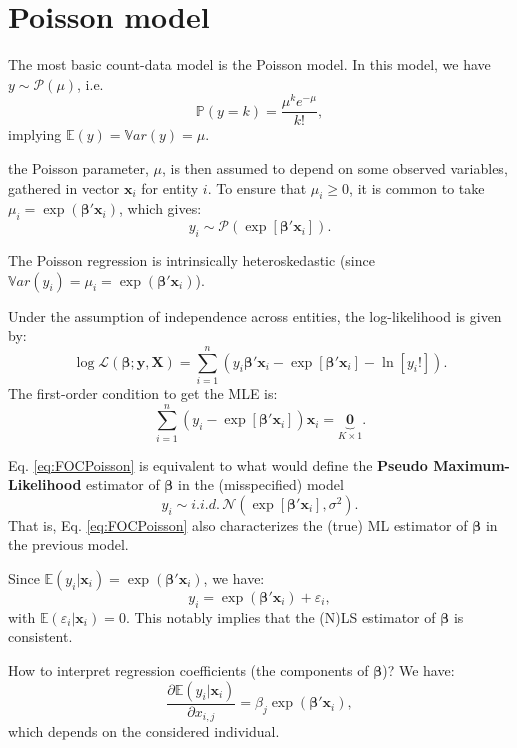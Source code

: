 \documentclass[
  12pt,
]{book}
\theoremstyle{definition}
\theoremstyle{definition}
\theoremstyle{definition}
\theoremstyle{definition}
\theoremstyle{remark}
\begin{document}
\hypertarget{poisson-model}{%
\section{Poisson model}\label{poisson-model}}

The most basic count-data model is the Poisson model. In this model, we have \(y \sim \mathcal{P}(\mu)\), i.e.
\[
\mathbb{P}(y=k) = \frac{\mu^k e^{-\mu}}{k!},
\]
implying \(\mathbb{E}(y) = \mathbb{V}ar(y) = \mu\).

the Poisson parameter, \(\mu\), is then assumed to depend on some observed variables, gathered in vector \(\mathbf{x}_i\) for entity \(i\). To ensure that \(\mu_i \ge 0\), it is common to take \(\mu_i = \exp(\boldsymbol\beta'\mathbf{x}_i)\), which gives:
\[
y_i \sim \mathcal{P}(\exp[\boldsymbol\beta'\mathbf{x}_i]).
\]

The Poisson regression is intrinsically heteroskedastic (since \(\mathbb{V}ar(y_i) = \mu_i = \exp(\boldsymbol\beta'\mathbf{x}_i)\)).

Under the assumption of independence across entities, the log-likelihood is given by:
\[
\log \mathcal{L}(\boldsymbol\beta;\mathbf{y},\mathbf{X}) = \sum_{i=1}^n (y_i \boldsymbol\beta'\mathbf{x}_i - \exp[\boldsymbol\beta'\mathbf{x}_i] - \ln[y_i!]).
\]
The first-order condition to get the MLE is:
\begin{equation}
\sum_{i=1}^n (y_i - \exp[\boldsymbol\beta'\mathbf{x}_i])\mathbf{x}_i = \underbrace{\mathbf{0}}_{K \times 1}. \label{eq:FOCPoisson}
\end{equation}

Eq. \eqref{eq:FOCPoisson} is equivalent to what would define the \textbf{Pseudo Maximum-Likelihood} estimator of \(\boldsymbol\beta\) in the (misspecified) model
\[
y_i \sim i.i.d.\,\mathcal{N}(\exp[\boldsymbol\beta'\mathbf{x}_i],\sigma^2).
\]
That is, Eq. \eqref{eq:FOCPoisson} also characterizes the (true) ML estimator of \(\boldsymbol\beta\) in the previous model.

Since \(\mathbb{E}(y_i|\mathbf{x}_i) = \exp(\boldsymbol\beta'\mathbf{x}_i)\), we have:
\[
y_i = \exp(\boldsymbol\beta'\mathbf{x}_i) + \varepsilon_i,
\]
with \(\mathbb{E}(\varepsilon_i|\mathbf{x}_i) = 0\). This notably implies that the (N)LS estimator of \(\boldsymbol\beta\) is consistent.

How to interpret regression coefficients (the components of \(\boldsymbol\beta\))? We have:
\[
\frac{\partial \mathbb{E}(y_i|\mathbf{x}_i)}{\partial x_{i,j}} = \beta_j \exp(\boldsymbol\beta'\mathbf{x}_i),
\]
which depends on the considered individual.
\end{document}
